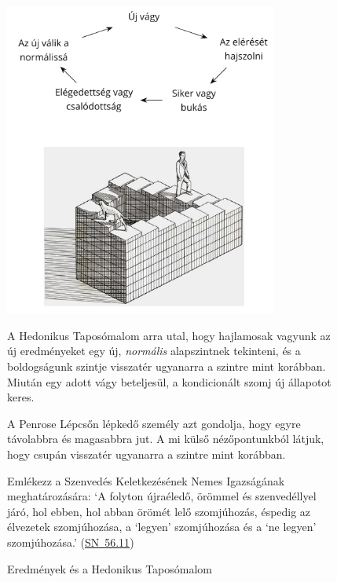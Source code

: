 \begin{figure}[h]
\caption{Eredmények és a Hedonikus Taposómalom}\label{fig-hedonic-treadmill}

\centering

\includegraphics[width=90mm]{./manuscript/tex/diagrams/hedonic-treadmill-stairs-hu.pdf}

\bigskip

\begin{minipage}{0.85\linewidth}
\centering\footnotesize

A Hedonikus Taposómalom arra utal,
hogy hajlamosak vagyunk az új eredményeket egy új, \emph{normális} alapszintnek tekinteni,
és a boldogságunk szintje visszatér ugyanarra a szintre mint korábban.
Miután egy adott vágy beteljesül, a kondicionált szomj új állapotot keres.

\bigskip

A Penrose Lépcsőn lépkedő személy azt gondolja,
hogy egyre távolabbra és magasabbra jut.
A mi külső nézőpontunkból látjuk,
hogy csupán visszatér ugyanarra a szintre mint korábban.

\bigskip

Emlékezz a Szenvedés Keletkezésének Nemes Igazságának meghatározására:
`A folyton újraéledő, örömmel és szenvedéllyel járó, hol ebben, hol abban örömét lelő szomjúhozás, éspedig az élvezetek szomjúhozása, a ‘legyen’ szomjúhozása és a ‘ne legyen’ szomjúhozása.'
(\href{https://a-buddha-ujja.hu/sn-56.11/hu/a-pali-fordito-csoport}{SN~56.11})

\end{minipage}

\end{figure}

